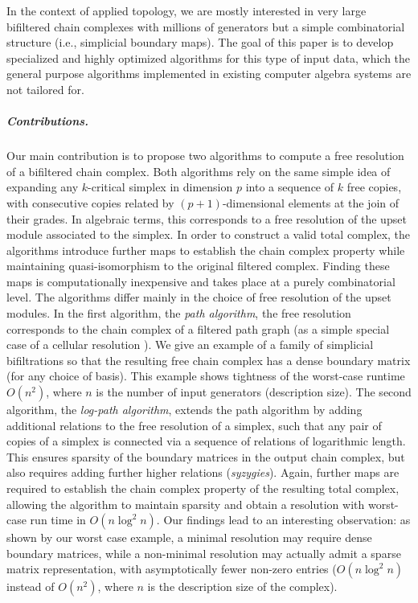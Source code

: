 \documentclass[11pt]{article}
\newcommand{\define}[1]{\emph{#1}} %
\begin{document}
In the context of applied topology, we are mostly interested in very large bifiltered chain complexes with millions of generators but a simple combinatorial structure (i.e., simplicial boundary maps).
The goal of this paper is to develop specialized and highly optimized algorithms for this type of input data, which the general purpose algorithms implemented in existing computer algebra systems are not tailored for.
%
\subparagraph{Contributions.}
%
Our main contribution is to propose two algorithms to compute a free resolution of a bifiltered chain complex. 
Both algorithms rely on the same simple idea of expanding any $k$-critical simplex in dimension $p$ into a sequence of $k$ free copies, with consecutive copies related by $(p+1)$-dimensional elements at the join of their grades.
In algebraic terms, this corresponds to a free resolution of the upset module associated to the simplex.
In order to construct a valid total complex,
the algorithms introduce further maps to establish the chain complex property while maintaining quasi-isomorphism to the original filtered complex.
Finding these maps is computationally inexpensive and takes place at a purely combinatorial level.
%
%
The algorithms differ mainly in the choice of free resolution of the upset modules. 
In the first algorithm, the \define{path algorithm}, the free resolution corresponds to the chain complex of a filtered path graph (as a simple special case of a cellular resolution \cite{bayer_sturmfels_cellular,miller_sturmfels_book}).
We give an example of a family of simplicial bifiltrations so that the resulting free chain complex has a dense boundary matrix (for any choice of basis).
This example shows tightness of the worst-case runtime $O(n^2)$, where $n$ is the number of input generators (description size). 
%
%
The second algorithm, the \define{log-path algorithm}, extends the path algorithm by adding additional relations to the free resolution of a simplex, such that any pair of copies of a simplex is connected via a sequence of relations of logarithmic length.
This ensures sparsity of the boundary matrices in the output chain complex, but also requires adding further higher relations (\define{syzygies}). 
Again, further maps are required to establish the chain complex property of the resulting total complex, allowing the algorithm to maintain sparsity and obtain a resolution with worst-case run time in $O(n\log^2n)$.
%
%
%
Our findings lead to  an interesting observation: as shown by our worst case example, a minimal resolution may require dense boundary matrices, while a non-minimal resolution may actually admit a sparse matrix representation, with asymptotically fewer non-zero entries ($O(n\log^2n)$ instead of $O(n^2)$, where $n$ is the description size of the complex).
\end{document}

